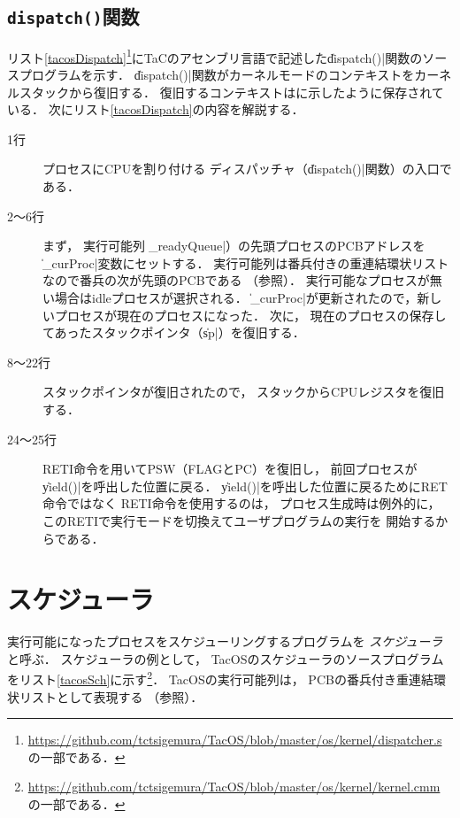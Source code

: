 \subsection{\texttt{dispatch()}関数}
リスト\ref{tacosDispatch}\footnote{
  \url{https://github.com/tctsigemura/TacOS/blob/master/os/kernel/dispatcher.s}
  の一部である．
}にTaCのアセンブリ言語で記述した\|dispatch()|関数のソースプログラムを示す．
\|dispatch()|関数がカーネルモードのコンテキストをカーネルスタックから復旧する．
復旧するコンテキストはに示したように保存されている．
次にリスト\ref{tacosDispatch}の内容を解説する．



\begin{description}
    \item[1行] プロセスにCPUを割り付ける
      ディスパッチャ（\|dispatch()|関数）の入口である．
    \item[2〜6行] まず，
      実行可能列（\|_readyQueue|）の先頭プロセスのPCBアドレスを
      \|_curProc|変数にセットする．
      実行可能列は番兵付きの重連結環状リストなので番兵の次が先頭のPCBである
      （参照）．
      実行可能なプロセスが無い場合はidleプロセスが選択される．
      \|_curProc|が更新されたので，新しいプロセスが現在のプロセスになった．
      次に，
      現在のプロセスの保存してあったスタックポインタ（\|sp|）を復旧する．
    \item[8〜22行] スタックポインタが復旧されたので，
      スタックからCPUレジスタを復旧する．
    \item[24〜25行] RETI命令を用いてPSW（FLAGとPC）を復旧し，
      前回プロセスが\|yield()|を呼出した位置に戻る．
      \|yield()|を呼出した位置に戻るためにRET命令ではなく
      RETI命令を使用するのは，
      プロセス生成時は例外的に，
      このRETIで実行モードを切換えてユーザプログラムの実行を
      開始するからである．
\end{description}

\section{スケジューラ}
実行可能になったプロセスをスケジューリングするプログラムを
\emph{スケジューラ}と呼ぶ．
スケジューラの例として，
TacOSのスケジューラのソースプログラムをリスト\ref{tacosSch}に示す\footnote{
  \url{https://github.com/tctsigemura/TacOS/blob/master/os/kernel/kernel.cmm}
  の一部である．}．
TacOSの実行可能列は，
PCBの番兵付き重連結環状リストとして表現する
（参照）．

